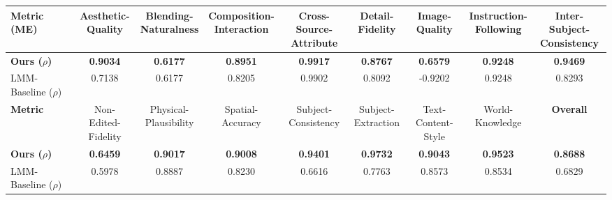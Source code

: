 \documentclass[11pt]{article}
\begin{document}
\begin{table}[htbp]
{\begin{tabular}{l c c c c c c c c}
      \textbf{Metric (ME)} &
      \makecell[c]{Aesthetic-\\Quality} &
      \makecell[c]{Blending-\\Naturalness} &
      \makecell[c]{Composition-\\Interaction} &
      \makecell[c]{Cross-Source-\\Attribute} &
      \makecell[c]{Detail-\\Fidelity} &
      \makecell[c]{Image-\\Quality} &
      \makecell[c]{Instruction-\\Following} &
      \makecell[c]{Inter-Subject-\\Consistency} \\
      \midrule
      \textbf{Ours ($\rho$)} & \textbf{0.9034} & \textbf{0.6177} & \textbf{0.8951} & \textbf{0.9917} & \textbf{0.8767} & \textbf{0.6579} & \textbf{0.9248} & \textbf{0.9469} \\
      LMM-Baseline ($\rho$) & 0.7138 & 0.6177 & 0.8205 & 0.9902 & 0.8092 & -0.9202 & 0.9248 & 0.8293 \\
      \midrule %
      
      \textbf{Metric} &
      \makecell[c]{Non-Edited-\\Fidelity} &
      \makecell[c]{Physical-\\Plausibility} &
      \makecell[c]{Spatial-\\Accuracy} &
      \makecell[c]{Subject-\\Consistency} &
      \makecell[c]{Subject-\\Extraction} &
      \makecell[c]{Text-Content-\\Style} &
      \makecell[c]{World-\\Knowledge} &
      \textbf{Overall} \\
      \midrule
      \textbf{Ours ($\rho$)} & \textbf{0.6459} & \textbf{0.9017} & \textbf{0.9008} & \textbf{0.9401} & \textbf{0.9732} & \textbf{0.9043} & \textbf{0.9523} & \textbf{0.8688} \\
      LMM-Baseline ($\rho$) & 0.5978 & 0.8887 & 0.8230 & 0.6616 & 0.7763 & 0.8573 & 0.8534 & 0.6829 \\
      \bottomrule %
      
    \end{tabular}
}
\end{table}
\end{document}
